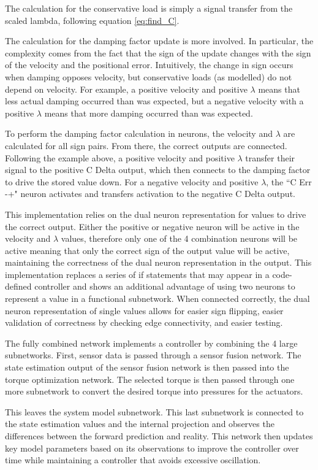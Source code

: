 
The calculation for the conservative load is simply a signal transfer from the scaled lambda, following equation \ref{eq:find_C}.


The calculation for the damping factor update is more involved. In particular,
the complexity comes from the fact that the sign of the update changes with the
sign of the velocity and the positional error. Intuitively, the change in sign occurs when
damping opposes velocity, but conservative loads (as modelled) do not depend on
velocity. For example, a positive velocity and positive $\lambda$ means that 
less actual damping occurred than was expected, but a negative velocity with a 
positive $\lambda$ means that more damping occurred than was expected.

To perform the damping factor calculation in neurons, the velocity and $\lambda$ are 
calculated for all sign pairs. From there, the correct outputs are connected.
Following the example above, a positive velocity and positive $\lambda$ transfer
their signal to the positive C Delta output, which then connects to the damping factor 
to drive the stored value down. For a negative velocity and positive $\lambda$, the ``C Err -+" neuron activates and transfers activation to the negative C Delta output.

This implementation relies on the dual neuron representation for values to drive
the correct output. Either the positive or negative neuron will be active in the
velocity and $\lambda$ values, therefore only one of the 4 combination neurons
will be active meaning that only the correct sign of the output value will be
active, maintaining the correctness of the dual neuron representation in the 
output. This implementation replaces a series of if statements that may appear
in a code-defined controller and shows an additional advantage of using two
neurons to represent a value in a functional subnetwork. When connected 
correctly, the dual neuron representation of single values allows for easier sign flipping, easier validation of correctness
by checking edge connectivity, and easier testing.


The fully combined network implements
a controller by combining the 4 large subnetworks. First, sensor data is passed
through a sensor fusion network. The state estimation output of the sensor 
fusion network is then passed into the torque optimization network. The 
selected torque is then passed through one more subnetwork to convert the
desired torque into pressures for the actuators.

This leaves the system model subnetwork. This last subnetwork is connected to 
the state estimation values and the internal projection and observes the 
differences between the forward prediction and reality. This network then 
updates key model parameters based on its observations to improve the controller over time while 
maintaining a controller that avoids excessive oscillation. 
